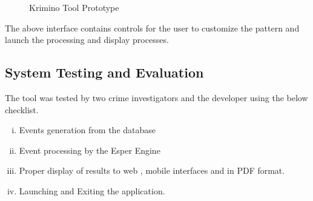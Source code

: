 \begin{center}
\begin{figure}[h]
\caption{Krimino Tool Prototype}

\end{figure}
\end{center}

\noindent The above interface contains controls for the user to customize the pattern and launch the processing and display processes.

\subsection{System Testing and Evaluation}

\noindent The tool was tested by two crime investigators and the developer using the below checklist.

\begin{enumerate}[(i)]
\item Events generation from the database
\item Event processing by the Esper Engine
\item Proper display of results to web , mobile interfaces and in PDF format.
\item Launching and Exiting the application.
 \end{enumerate}






